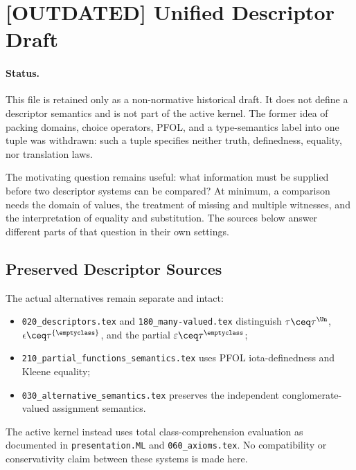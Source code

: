 \def\topic{[OUTDATED] Unified Descriptors}

\section{[OUTDATED] Unified Descriptor Draft}

\paragraph{Status.}
This file is retained only as a non-normative historical draft. It does not
define a descriptor semantics and is not part of the active kernel. The former
idea of packing domains, choice operators, PFOL, and a type-semantics label
into one tuple was withdrawn: such a tuple specifies neither truth,
definedness, equality, nor translation laws.

The motivating question remains useful: what information must be supplied
before two descriptor systems can be compared? At minimum, a comparison
needs the domain of values, the treatment of missing and multiple witnesses,
and the interpretation of equality and substitution. The sources below
answer different parts of that question in their own settings.

\subsection{Preserved Descriptor Sources}
The actual alternatives remain separate and intact:
\begin{itemize}
\item \texttt{020\_descriptors.tex} and \texttt{180\_many-valued.tex}
  distinguish $\tau\ceq\tau^{\Un}$,
  $\epsilon\ceq\tau^{\{\emptyclass\}}$, and the partial
  $\varepsilon\ceq\tau^{\emptyclass}$;
\item \texttt{210\_partial\_functions\_semantics.tex} uses PFOL
  iota-definedness and Kleene equality;
\item \texttt{030\_alternative\_semantics.tex} preserves the independent
  conglomerate-valued assignment semantics.
\end{itemize}

The active kernel instead uses total class-comprehension evaluation as
documented in \texttt{presentation.ML} and \texttt{060\_axioms.tex}. No
compatibility or conservativity claim between these systems is made here.


